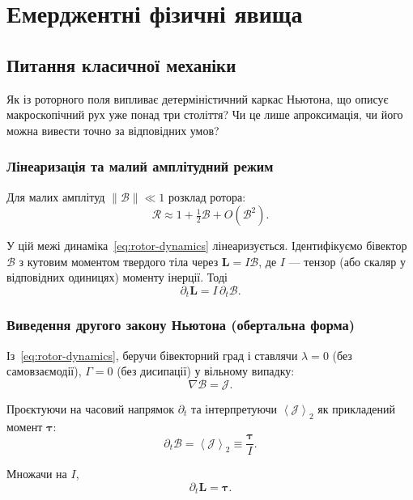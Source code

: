 \documentclass[11pt,a4paper]{article}
\newcommand{\grade}[2]{\left\langle #1 \right\rangle_{#2}}
\newcommand{\biv}[1]{\grade{#1}{2}}
\newcommand{\Rotor}{\mathcal{R}}
\newcommand{\Biv}{\mathcal{B}}
\newcommand{\D}{\nabla}                        %
\theoremstyle{definition}
\theoremstyle{plain}
\theoremstyle{remark}
\begin{document}
\section{Емерджентні фізичні явища}\label{sec:emergent}

\subsection{Питання класичної механіки}

Як із роторного поля випливає детерміністичний каркас Ньютона, що описує макроскопічний рух уже понад три століття? Чи це лише апроксимація, чи його можна вивести точно за відповідних умов?

\subsubsection{Лінеаризація та малий амплітудний режим}

Для малих амплітуд $\|\Biv\| \ll 1$ розклад ротора:
\begin{equation}
\Rotor \approx 1 + \tfrac{1}{2}\Biv + O(\Biv^2).
\end{equation}

У цій межі динаміка~\eqref{eq:rotor-dynamics} лінеаризується. Ідентифікуємо бівектор $\Biv$ з кутовим моментом твердого тіла через $\bm{L} = I\Biv$, де $I$ — тензор (або скаляр у відповідних одиницях) моменту інерції. Тоді
\begin{equation}
\partial_t \bm{L} = I\, \partial_t \Biv.
\end{equation}

\subsubsection{Виведення другого закону Ньютона (обертальна форма)}

Із~\eqref{eq:rotor-dynamics}, беручи бівекторний град і ставлячи $\lambda=0$ (без самовзаємодії), $\Gamma=0$ (без дисипації) у вільному випадку:
\begin{equation}
\D \Biv = \mathcal{J}.
\end{equation}

Проєктуючи на часовий напрямок $\partial_t$ та інтерпретуючи $\biv{\mathcal{J}}$ як прикладений момент $\bm{\tau}$:
\begin{equation}
\partial_t \Biv = \biv{\mathcal{J}} \equiv \frac{\bm{\tau}}{I}.
\end{equation}

Множачи на $I$,
\begin{equation}
\partial_t \bm{L} = \bm{\tau}.
\label{eq:newton-rotational}
\end{equation}
\end{document}
